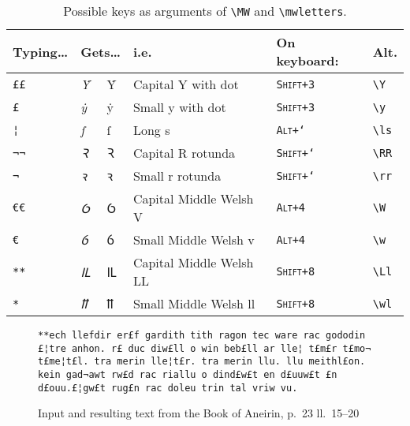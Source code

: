 \begin{table}[h]
\Large\centering
\begin{tabular}{@{}llllll@{}}
\toprule
Typing… & \multicolumn{2}{l}{Gets…} & i.e. & On keyboard: & Alt. \\ \midrule
\texttt{££} & \textit{Ẏ} & Ẏ & Capital Y with dot & \texttt{\textsc{Shift+3}} & \texttt{\textbackslash Y} \\
\texttt{£} & \textit{ẏ} & ẏ & Small y with dot & \texttt{\textsc{Shift+3}} & \texttt{\textbackslash y} \\
\texttt{¦} & \textit{ſ} & ſ & Long s & \texttt{\textsc{Alt+`}} & \texttt{\textbackslash ls} \\
\texttt{¬¬} & \textit{Ꝛ} & Ꝛ & Capital R rotunda & \texttt{\textsc{Shift+`}} & \texttt{\textbackslash RR} \\
\texttt{¬} & \textit{ꝛ} & ꝛ & Small r rotunda & \texttt{\textsc{Shift+`}} & \texttt{\textbackslash rr} \\
\texttt{€€} & \textit{Ỽ} & Ỽ & Capital Middle Welsh V & \texttt{\textsc{Alt+4}} & \texttt{\textbackslash W} \\
\texttt{€} & \textit{ỽ} & ỽ & Small Middle Welsh v & \texttt{\textsc{Alt+4}} & \texttt{\textbackslash w} \\
\texttt{**} & \textit{Ỻ} & Ỻ & Capital Middle Welsh LL & \texttt{\textsc{Shift+8}} & \texttt{\textbackslash Ll} \\
\texttt{*} & \textit{ỻ} & ỻ & Small Middle Welsh ll & \texttt{\textsc{Shift+8}} & \texttt{\textbackslash wl} \\ \bottomrule
\end{tabular}
\caption{Possible keys as arguments of \texttt{\textbackslash MW} and \texttt{\textbackslash mwletters}.}
\end{table}


\begin{figure}[h]
\begin{minipage}{0.45\textwidth}
\footnotesize\texttt{**ech llefdir er£f gardith tith ragon tec ware rac gododin £¦tre anhon. r£ duc diw£ll o win beb£ll ar lle¦ t£m£r t£mo¬ t£me¦t£l. tra merin lle¦t£r. tra merin llu. llu meithl£on. kein gad¬awt rw£d rac riallu o dind£w£t en d£uuw£t £n d£ouu.£¦gw£t rug£n rac doleu trin tal vriw vu.}
\end{minipage}
\hfill
\begin{minipage}{0.45\textwidth}
\end{minipage}
\caption{Input and resulting text from the Book of Aneirin, p.~23 ll.~15--20}
\end{figure}

